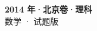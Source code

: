 \documentclass[zihao=-4, a4paper]{ctexart}
\begin{document}
\begin{center}
  {\Large\bfseries 2014 年·北京卷·理科}\\[4pt]
  {\large 数学 · 试题版}
\end{center}
\medskip
{}

\end{document}
